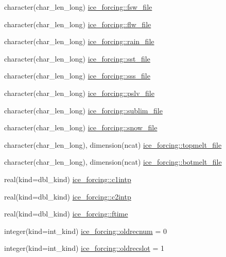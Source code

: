 \begin{DoxyCompactItemize}
\item 
character(char\_\-len\_\-long) \hyperlink{namespaceice__forcing_ad4465d0f13c0141d16998d7771003a45}{ice\_\-forcing::fsw\_\-file}
\item 
character(char\_\-len\_\-long) \hyperlink{namespaceice__forcing_a80a3c80bad2ac9ab38aff61fdaf8084e}{ice\_\-forcing::flw\_\-file}
\item 
character(char\_\-len\_\-long) \hyperlink{namespaceice__forcing_a872adfb9cc20037a1b0dc19f317438bd}{ice\_\-forcing::rain\_\-file}
\item 
character(char\_\-len\_\-long) \hyperlink{namespaceice__forcing_a33afd2f71d0f18c27e6a2e78388dbb31}{ice\_\-forcing::sst\_\-file}
\item 
character(char\_\-len\_\-long) \hyperlink{namespaceice__forcing_a679cbae21b157e961355e2d69701a241}{ice\_\-forcing::sss\_\-file}
\item 
character(char\_\-len\_\-long) \hyperlink{namespaceice__forcing_a6aaf5d68f7a6e2eca9949390469c09eb}{ice\_\-forcing::pslv\_\-file}
\item 
character(char\_\-len\_\-long) \hyperlink{namespaceice__forcing_a91c5310add7d3da3da2f948d150844ca}{ice\_\-forcing::sublim\_\-file}
\item 
character(char\_\-len\_\-long) \hyperlink{namespaceice__forcing_aa253506c47f71090fd11a5b309eecf7e}{ice\_\-forcing::snow\_\-file}
\item 
character(char\_\-len\_\-long), dimension(ncat) \hyperlink{namespaceice__forcing_a22a86e9e628aeff874655d16792b2637}{ice\_\-forcing::topmelt\_\-file}
\item 
character(char\_\-len\_\-long), dimension(ncat) \hyperlink{namespaceice__forcing_a0278acba1215b398580f3e503a8baf11}{ice\_\-forcing::botmelt\_\-file}
\item 
real(kind=dbl\_\-kind) \hyperlink{namespaceice__forcing_a56dcb1f5a344ec3a10ce9138f9418e51}{ice\_\-forcing::c1intp}
\item 
real(kind=dbl\_\-kind) \hyperlink{namespaceice__forcing_ad041327090c6188e198972d2e2162197}{ice\_\-forcing::c2intp}
\item 
real(kind=dbl\_\-kind) \hyperlink{namespaceice__forcing_a7818997d422d32d4d238d866a60e50a7}{ice\_\-forcing::ftime}
\item 
integer(kind=int\_\-kind) \hyperlink{namespaceice__forcing_ad802bdcf2b496e0e3b0cf226abe288ec}{ice\_\-forcing::oldrecnum} = 0
\item 
integer(kind=int\_\-kind) \hyperlink{namespaceice__forcing_abf29b2295f18d12d51a4d993a2589770}{ice\_\-forcing::oldrecslot} = 1

\end{DoxyCompactItemize}
